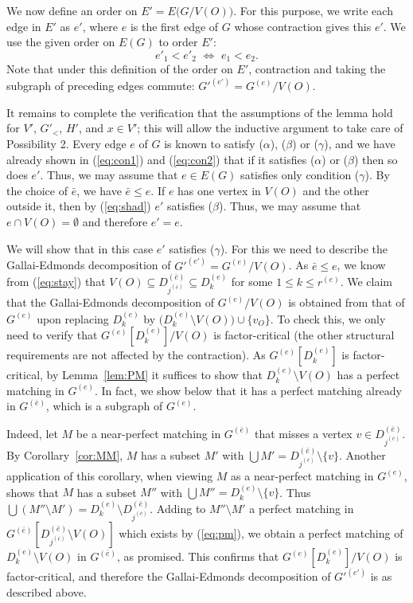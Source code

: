 \documentclass{article}
\theoremstyle{definition}
\begin{document}
We now define an order on $E' = E\bigl(G/V(O)\bigr)$. For this purpose, we write each edge in $E'$ as $e'$, where $e$ is the first edge of $G$ whose contraction gives this $e'$. We use the given order on $E(G)$ to order $E'$: \[ e'_1 < e'_2\,\, \Longleftrightarrow\,\,e_1 < e_2.\]
Note that under this definition of the order on $E'$, contraction and taking the subgraph of preceding edges commute: $G'^{(e')} = G^{(e)}/V(O)$.

It remains to complete the verification that the assumptions of the lemma hold for $V'$, $G'_<$, $H'$, and $x \in V'$; this will allow the inductive argument to take care of Possibility 2. Every edge $e$ of $G$ is known to satisfy ($\alpha$), ($\beta$) or ($\gamma$), and we have already shown in (\ref{eq:con1}) and (\ref{eq:con2}) that if it satisfies ($\alpha$) or ($\beta$) then so does $e'$. Thus, we may assume that $e \in E(G)$ satisfies only condition ($\gamma$). By the choice of $\bar{e}$, we have $\bar{e} \le e$. If $e$ has one vertex in $V(O)$ and the other outside it, then by (\ref{eq:shad}) $e'$ satisfies ($\beta$). Thus, we may assume that $e \cap V(O) = \emptyset$ and therefore $e' = e$.

We will show that in this case $e'$ satisfies ($\gamma$). For this we need to describe the Gallai-Edmonds decomposition of $G'^{(e')} = G^{(e)}/V(O)$. As $\bar{e} \le e$, we know from (\ref{eq:stay}) that $V(O) \subseteq D_{j^{(\bar{e})}}^{(\bar{e})} \subseteq D_k^{(e)}$ for some $1 \le k \le r^{(e)}$. We claim that the Gallai-Edmonds decomposition of $G^{(e)}/V(O)$ is obtained from that of $G^{(e)}$ upon replacing $D_k^{(e)}$ by $\bigl( D_k^{(e)} \setminus V(O)\bigr) \cup \{v_O\}$. To check this, we only need to verify that $G^{(e)}[D_k^{(e)}]/V(O)$ is factor-critical (the other structural requirements are not affected by the contraction). As $G^{(e)}[D_k^{(e)}]$ is factor-critical, by Lemma~\ref{lem:PM} it suffices to show that $D_k^{(e)} \setminus V(O)$ has a perfect matching in $G^{(e)}$. In fact, we show below that it has a perfect matching already in $G^{(\bar{e})}$, which is a subgraph of $G^{(e)}$.

Indeed, let $M$ be a near-perfect matching in $G^{(\bar{e})}$ that misses a vertex $v \in D_{j^{(\bar{e})}}^{(\bar{e})}$. By Corollary~\ref{cor:MM}, $M$ has a subset $M'$ with $\bigcup M' = D_{j^{(\bar{e})}}^{(\bar{e})} \setminus \{v\}$. Another application of this corollary, when viewing $M$ as a near-perfect matching in $G^{(e)}$, shows that $M$ has a subset $M''$ with $\bigcup M'' = D_k^{(e)} \setminus \{v\}$. Thus $\bigcup (M'' \setminus M') = D_k^{(e)} \setminus D_{j^{(\bar{e})}}^{(\bar{e})}$. Adding to $M'' \setminus M'$ a perfect matching in $G^{(\bar{e})}[D_{j^{(\bar{e})}}^{(\bar{e})} \setminus V(O)]$ which exists by (\ref{eq:pm}), we obtain a perfect matching of $D_k^{(e)} \setminus V(O)$ in $G^{(\bar{e})}$, as promised. This confirms that $G^{(e)}[D_k^{(e)}]/V(O)$ is factor-critical, and therefore the Gallai-Edmonds decomposition of $G'^{(e')}$ is as described above.
\end{document}
